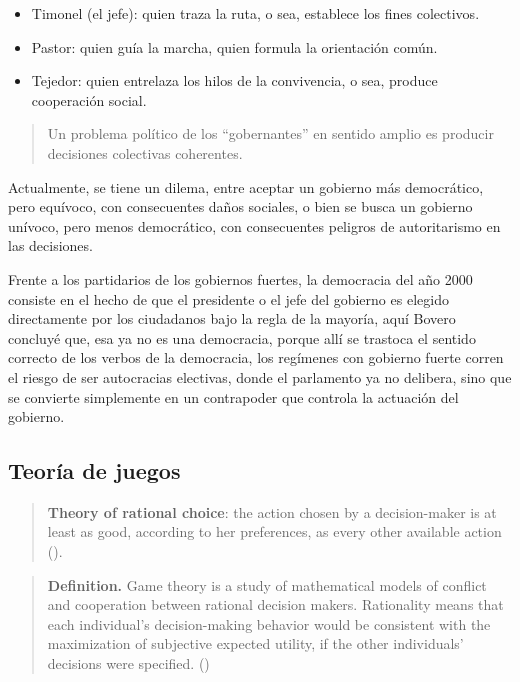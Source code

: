 \documentclass[
  letterpaper,
  DIV=11,
  numbers=noendperiod]{scrreprt}
\begin{document}
\begin{itemize}
\item
  Timonel (el jefe): quien traza la ruta, o sea, establece los fines
  colectivos.
\item
  Pastor: quien guía la marcha, quien formula la orientación común.
\item
  Tejedor: quien entrelaza los hilos de la convivencia, o sea, produce
  cooperación social.
\end{itemize}

\begin{quote}
Un problema político de los ``gobernantes'' en sentido amplio es
producir decisiones colectivas coherentes.
\end{quote}

Actualmente, se tiene un dilema, entre aceptar un gobierno más
democrático, pero equívoco, con consecuentes daños sociales, o bien se
busca un gobierno unívoco, pero menos democrático, con consecuentes
peligros de autoritarismo en las decisiones.

Frente a los partidarios de los gobiernos fuertes, la democracia del año
2000 consiste en el hecho de que el presidente o el jefe del gobierno es
elegido directamente por los ciudadanos bajo la regla de la mayoría,
aquí Bovero concluyé que, esa ya no es una democracia, porque allí se
trastoca el sentido correcto de los verbos de la democracia, los
regímenes con gobierno fuerte corren el riesgo de ser autocracias
electivas, donde el parlamento ya no delibera, sino que se convierte
simplemente en un contrapoder que controla la actuación del gobierno.

\subsection{Teoría de juegos}\label{teoruxeda-de-juegos}

\begin{quote}
\textbf{Theory of rational choice}: the action chosen by a
decision-maker is at least as good, according to her preferences, as
every other available action ().
\end{quote}

\begin{quote}
\textbf{Definition.} Game theory is a study of mathematical models of
conflict and cooperation between rational decision makers. Rationality
means that each individual's decision-making behavior would be
consistent with the maximization of subjective expected utility, if the
other individuals' decisions were specified.
()
\end{quote}
\end{document}
